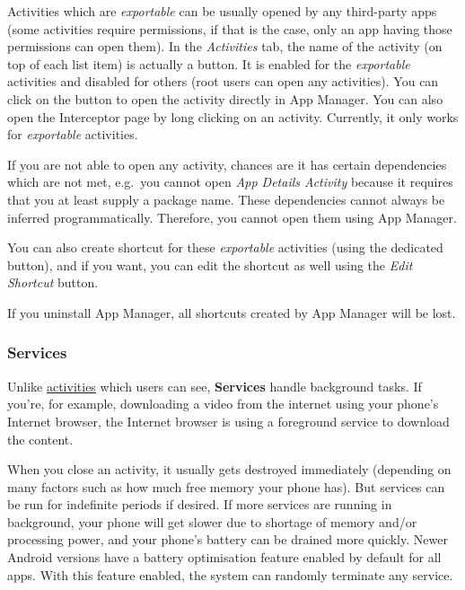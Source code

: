 Activities which are \textit{exportable} can be usually opened by any third-party apps (some activities require
permissions, if that is the case, only an app having those permissions can open them). In the \textit{Activities} tab,
the name of the activity (on top of each list item) is actually a button. It is enabled for the \textit{exportable}
activities and disabled for others (root users can open any activities). You can click on the button to open the
activity directly in App Manager. You can also open the Interceptor page by long clicking on an activity. Currently, it
only works for \textit{exportable} activities.

\begin{warning}[Notice]
    If you are not able to open any activity, chances are it has certain dependencies which are not met, e.g.\ you
    cannot open  \textit{App Details Activity} because it requires that you at least supply a package name. These
    dependencies cannot always be inferred programmatically. Therefore, you cannot open them using App Manager.
\end{warning}

You can also create shortcut for these \textit{exportable} activities (using the dedicated button), and if you want, you
can edit the shortcut as well using the \textit{Edit Shortcut} button.

\begin{danger}[Caution]
    If you uninstall App Manager, all shortcuts created by App Manager will be lost.
\end{danger}

\subsubsection{Services}\label{subsubsec:details:servcies}
Unlike \hyperref[subsubsec:activities]{activities} which users can see, \textbf{Services} handle background tasks. If
you're, for example, downloading a video from the internet using your phone's Internet browser, the Internet browser is
using a foreground service to download the content.

When you close an activity, it usually gets destroyed immediately (depending on many factors such as how much free
memory your phone has). But services can be run for indefinite periods if desired. If more services are running in
background, your phone will get slower due to shortage of memory and/or processing power, and your phone's battery can
be drained more quickly. Newer Android versions have a battery optimisation feature enabled by default for all apps.
With this feature enabled, the system can randomly terminate any service.

